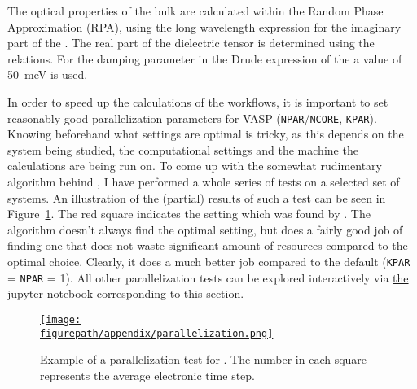 \begin{refsection}
The optical properties of the bulk are calculated within the Random Phase 
Approximation (RPA), using the long wavelength expression for the imaginary 
part of the . The real part of the dielectric tensor is 
determined using the  relations. For the damping parameter in 
the Drude expression of the  a value of 50~\si{\milli\electronvolt} is used.

\pagebreak[4]

In order to speed up the calculations of the workflows, it is important to set 
reasonably good parallelization parameters for VASP 
(\texttt{NPAR}/\texttt{NCORE}, \texttt{KPAR}). Knowing beforehand what settings 
are optimal is tricky, as this depends on the system being studied, the 
computational settings and the machine the calculations are being run on. To 
come up with the somewhat rudimentary algorithm behind 
,
I have performed a whole series of tests on a selected set of systems. An 
illustration of the (partial) results of such a test can be seen in 
Figure~\ref{appendix:fig-parallelization}. The red square indicates the setting 
which was found by
. 
The algorithm doesn't always find the optimal setting, but does a fairly good 
job of finding one that does not waste significant amount of resources compared 
to the optimal choice. Clearly, it does a much better job compared to the default
(\texttt{KPAR} = \texttt{NPAR} = 1). All other parallelization tests can be 
explored interactively via \href{https://mybinder.org/v2/gh/mbercx/jupyter/master?filepath=parallel\%2Fparallel_analysis.ipynb}{the jupyter notebook corresponding 
to this section.}

\begin{figure}[ht]
\centering
\href{https://www.youtube.com/watch?v=q8rcTvAoRzk}{
\texttt{[image: \\figurepath/appendix/parallelization.png]}
}
\caption{Example of a parallelization test for . The number in each 
square represents the average electronic time step.}
\label{appendix:fig-parallelization}
\end{figure}
 
\pagebreak[4]


\end{refsection}
